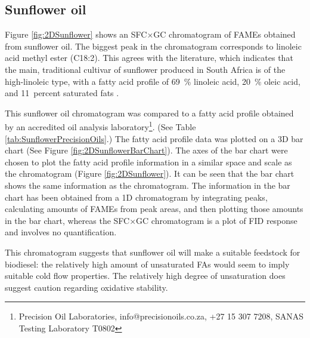 \subsection{Sunflower oil}

Figure \ref{fig:2DSunflower} shows an SFC×GC chromatogram of FAMEs obtained from
sunflower oil. The biggest peak in the chromatogram corresponds to linoleic acid
methyl ester (C18:2). This agrees with the literature, which indicates that the
main, traditional cultivar of sunflower produced in South Africa is of the
high-linoleic type, with a fatty acid profile of \SI{69}{\percent} linoleic
acid, \SI{20}{\percent} oleic acid, and \SI{11}{percent} saturated fats
\autocite {JFAOWHOCAC2019}.

This sunflower oil chromatogram was compared to a fatty acid profile obtained by
an accredited oil analysis laboratory\footnote{Precision Oil Laboratories,
info@precisionoils.co.za,  +27 15 307 7208, SANAS Testing Laboratory T0802}.
(See Table \ref{tab:SunflowerPrecisionOils}.) The fatty acid profile data was
plotted on a 3D bar chart (See Figure \ref{fig:2DSunflowerBarChart}). The axes
of the bar chart were chosen to plot the fatty acid profile information in a
similar space and scale as the chromatogram (Figure \ref{fig:2DSunflower}). It
can be seen that the bar chart shows the same information as the chromatogram.
The information in the bar chart has been obtained from a 1D chromatogram by
integrating peaks, calculating amounts of FAMEs from peak areas, and then
plotting those amounts in the bar chart, whereas the SFC×GC chromatogram is a
plot of FID response and involves no quantification.

This chromatogram suggests that sunflower oil will make a suitable feedstock for
biodiesel: the relatively high amount of unsaturated FAs would seem to imply
suitable cold flow properties. The relatively high degree of unsaturation does
suggest caution regarding oxidative stability.

